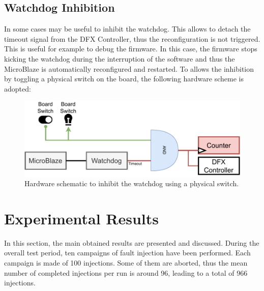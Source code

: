 \subsection{Watchdog Inhibition}
In some cases may be useful to inhibit the watchdog. This allows to detach the timeout signal from the DFX Controller, thus the reconfiguration is not triggered. This is useful for example to debug the firmware. In this case, the firmware stops kicking the watchdog during the interruption of the software and thus the MicroBlaze is automatically reconfigured and restarted. To allows the inhibition by toggling a physical switch on the board, the following hardware scheme is adopted:

\begin{figure}[H]
\centering
\includegraphics[width=0.95\linewidth]{images/chapter5/btn.pdf}
\caption{Hardware schematic to inhibit the watchdog using a physical switch.}
\end{figure}



\section{Experimental Results}

In this section, the main obtained results are presented and discussed. During the overall test period, ten campaigns of fault injection have been performed. Each campaign is made of 100 injections. Some of them are aborted, thus the mean number of completed injections per run is around 96, leading to a total of 966 injections. \bigskip

